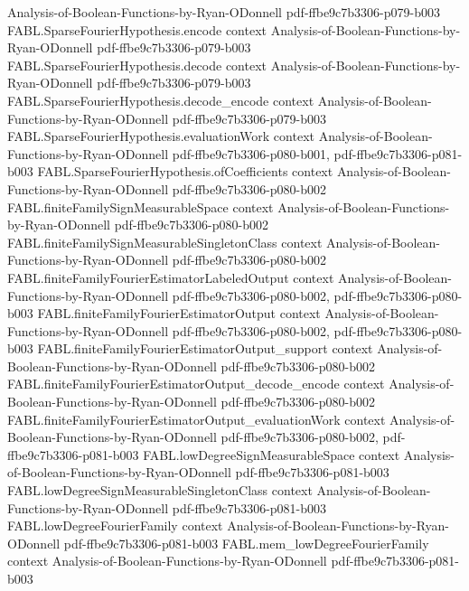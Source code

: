 \begin{theorem}
  {Analysis-of-Boolean-Functions-by-Ryan-ODonnell}
  {pdf-ffbe9c7b3306-p079-b003}
\proofstep
  {FABL.SparseFourierHypothesis.encode}
  {context}
  {Analysis-of-Boolean-Functions-by-Ryan-ODonnell}
  {pdf-ffbe9c7b3306-p079-b003}
\proofstep
  {FABL.SparseFourierHypothesis.decode}
  {context}
  {Analysis-of-Boolean-Functions-by-Ryan-ODonnell}
  {pdf-ffbe9c7b3306-p079-b003}
\proofstep
  {FABL.SparseFourierHypothesis.decode_encode}
  {context}
  {Analysis-of-Boolean-Functions-by-Ryan-ODonnell}
  {pdf-ffbe9c7b3306-p079-b003}
\proofstep
  {FABL.SparseFourierHypothesis.evaluationWork}
  {context}
  {Analysis-of-Boolean-Functions-by-Ryan-ODonnell}
  {pdf-ffbe9c7b3306-p080-b001,
    pdf-ffbe9c7b3306-p081-b003}
\proofstep
  {FABL.SparseFourierHypothesis.ofCoefficients}
  {context}
  {Analysis-of-Boolean-Functions-by-Ryan-ODonnell}
  {pdf-ffbe9c7b3306-p080-b002}
\proofstep
  {FABL.finiteFamilySignMeasurableSpace}
  {context}
  {Analysis-of-Boolean-Functions-by-Ryan-ODonnell}
  {pdf-ffbe9c7b3306-p080-b002}
\proofstep
  {FABL.finiteFamilySignMeasurableSingletonClass}
  {context}
  {Analysis-of-Boolean-Functions-by-Ryan-ODonnell}
  {pdf-ffbe9c7b3306-p080-b002}
\proofstep
  {FABL.finiteFamilyFourierEstimatorLabeledOutput}
  {context}
  {Analysis-of-Boolean-Functions-by-Ryan-ODonnell}
  {pdf-ffbe9c7b3306-p080-b002,
    pdf-ffbe9c7b3306-p080-b003}
\proofstep
  {FABL.finiteFamilyFourierEstimatorOutput}
  {context}
  {Analysis-of-Boolean-Functions-by-Ryan-ODonnell}
  {pdf-ffbe9c7b3306-p080-b002,
    pdf-ffbe9c7b3306-p080-b003}
\proofstep
  {FABL.finiteFamilyFourierEstimatorOutput_support}
  {context}
  {Analysis-of-Boolean-Functions-by-Ryan-ODonnell}
  {pdf-ffbe9c7b3306-p080-b002}
\proofstep
  {FABL.finiteFamilyFourierEstimatorOutput_decode_encode}
  {context}
  {Analysis-of-Boolean-Functions-by-Ryan-ODonnell}
  {pdf-ffbe9c7b3306-p080-b002}
\proofstep
  {FABL.finiteFamilyFourierEstimatorOutput_evaluationWork}
  {context}
  {Analysis-of-Boolean-Functions-by-Ryan-ODonnell}
  {pdf-ffbe9c7b3306-p080-b002,
    pdf-ffbe9c7b3306-p081-b003}
\proofstep
  {FABL.lowDegreeSignMeasurableSpace}
  {context}
  {Analysis-of-Boolean-Functions-by-Ryan-ODonnell}
  {pdf-ffbe9c7b3306-p081-b003}
\proofstep
  {FABL.lowDegreeSignMeasurableSingletonClass}
  {context}
  {Analysis-of-Boolean-Functions-by-Ryan-ODonnell}
  {pdf-ffbe9c7b3306-p081-b003}
\proofstep
  {FABL.lowDegreeFourierFamily}
  {context}
  {Analysis-of-Boolean-Functions-by-Ryan-ODonnell}
  {pdf-ffbe9c7b3306-p081-b003}
\proofstep
  {FABL.mem_lowDegreeFourierFamily}
  {context}
  {Analysis-of-Boolean-Functions-by-Ryan-ODonnell}
  {pdf-ffbe9c7b3306-p081-b003}

\end{theorem}
